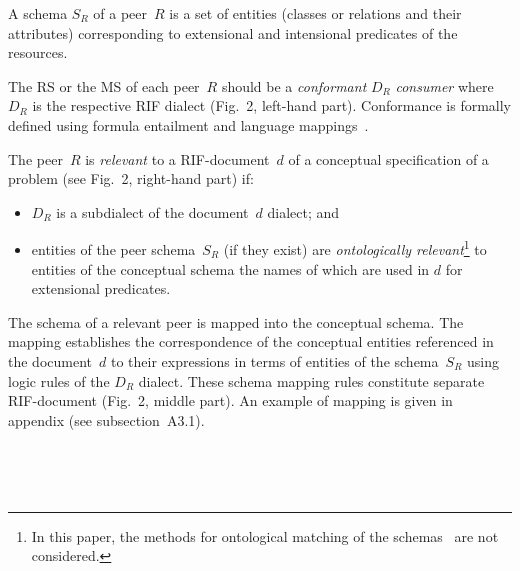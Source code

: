 \begin{multicols}{2}
  A schema $S_R$ of a peer~$R$ is a set of entities (classes or relations and their
attributes) corresponding to extensional and intensional predicates of the resources.

  The RS or the MS of each peer~$R$ should be a
\textit{conformant} $D_R$ \textit{consumer} where $D_R$ is the respective RIF dialect
(Fig.~2, left-hand part). Conformance is formally defined using formula entailment
and language mappings~\cite{19-kal}.

  The peer~$R$ is \textit{relevant} to a RIF-document~$d$ of a conceptual
specification of a problem (see Fig.~2, right-hand part) if:
  \begin{itemize}
\item $D_R$ is a subdialect of the document~$d$ dialect; and
\item entities of the peer schema~$S_R$ (if they exist) are \textit{ontologically
relevant}\footnote{In this paper,  the methods for ontological matching
of the schemas~\cite{15-kal} are not considered.} to entities of the conceptual schema the names of
which are used in $d$ for extensional predicates.
\end{itemize}

  The schema of a relevant peer is mapped into the conceptual schema. The mapping
establishes the correspondence of the conceptual entities referenced in the
document~$d$  to their expressions in terms of entities of the schema~$S_R$ using
logic rules of the $D_R$  dialect. These schema mapping rules constitute separate
RIF-document (Fig.~2, middle part). An example of mapping is given in appendix
(see subsection~A3.1).

\end{multicols}

\begin{figure}[h] %
   \vspace*{1pt}
 \begin{center}
 \mbox{%
 \epsfxsize=162.976mm
 }
 \end{center}
 \vspace*{-6pt}
\end{figure}



\begin{figure}[b] %
   \vspace*{1pt}
 \begin{center}
 \mbox{%
 \epsfxsize=165.582mm
 }
 \end{center}
 \vspace*{-6pt}
  \end{figure}

